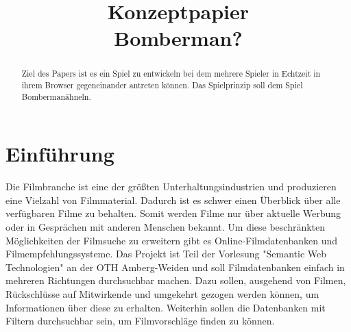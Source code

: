 \documentclass[conference]{IEEEtran}
\begin{document}
\title{Konzeptpapier\\Bomberman?}

\author{
	\and

	\and

	\and

	\and

}

\maketitle

\begin{abstract}
	Ziel des Papers ist es ein Spiel zu entwickeln bei dem mehrere Spieler in Echtzeit in ihrem Browser gegeneinander antreten können. Das Spielprinzip soll dem Spiel \glqq Bomberman\grqq ähneln.
\end{abstract}

\section{Einführung}



Die Filmbranche ist eine der größten Unterhaltungsindustrien und produzieren eine Vielzahl von Filmmaterial.
Dadurch ist es schwer einen Überblick über alle verfügbaren Filme zu behalten.
Somit werden Filme nur über aktuelle Werbung oder in Gesprächen mit anderen Menschen bekannt.
Um diese beschränkten Möglichkeiten der Filmsuche zu erweitern gibt es Online-Filmdatenbanken und Filmempfehlungssysteme.
Das Projekt ist Teil der Vorlesung "Semantic Web Technologien" an der OTH Amberg-Weiden und soll Filmdatenbanken einfach in mehreren Richtungen durchsuchbar machen.
Dazu sollen, ausgehend von Filmen, Rückschlüsse auf Mitwirkende und umgekehrt gezogen werden können, um Informationen über diese zu erhalten.
Weiterhin sollen die Datenbanken mit Filtern durchsuchbar sein, um Filmvorschläge finden zu können.
\end{document}
